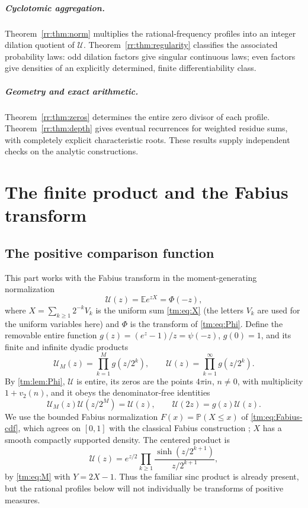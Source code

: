 \documentclass[11pt,a4paper,oneside,openany]{book}
\numberwithin{equation}{chapter}
\theoremstyle{definition}
\theoremstyle{remark}
\newcommand{\E}{\mathbb E}
\newcommand{\Prob}{\mathbb P}
\newcommand{\ii}{\mathrm i}
\newcommand{\Up}{\mathcal U}
\begin{document}
\paragraph{Cyclotomic aggregation.}
Theorem~\ref{rr:thm:norm} multiplies the rational-frequency profiles into an integer dilation quotient of \(\Up\). Theorem~\ref{rr:thm:regularity} classifies the associated probability laws: odd dilation factors give singular continuous laws; even factors give densities of an explicitly determined, finite differentiability class.

\paragraph{Geometry and exact arithmetic.}
Theorem~\ref{rr:thm:zeros} determines the entire zero divisor of each profile. Theorem~\ref{rr:thm:depth} gives eventual recurrences for weighted residue sums, with completely explicit characteristic roots. These results supply independent checks on the analytic constructions.

\chapter{The finite product and the Fabius transform}
\label{rr:sec:background}
\section{The positive comparison function}
This part works with the Fabius transform in the moment-generating
normalization
\begin{equation}\label{rr:eq:Umgf}
 \Up(z)=\E e^{zX}=\Phi(-z),
\end{equation}
where $X=\sum_{k\ge1}2^{-k}V_k$ is the uniform sum \eqref{tm:eq:X} (the
letters $V_k$ are used for the uniform variables here) and $\Phi$ is the
transform of \eqref{tm:eq:Phi}. Define the removable entire function
$g(z)=(e^z-1)/z=\psi(-z)$, $g(0)=1$, and its finite and infinite dyadic
products
\begin{equation}\label{rr:eq:U}
 \Up_M(z)=\prod_{k=1}^Mg(z/2^k),\qquad
 \Up(z)=\prod_{k=1}^{\infty}g(z/2^k).
\end{equation}
By \cref{tm:lem:Phi}, $\Up$ is entire, its zeros are the points $4\pi\ii n$,
$n\ne0$, with multiplicity $1+v_2(n)$, and it obeys the denominator-free
identities
\begin{equation}\label{rr:eq:Utail}
 \Up_M(z)\Up(z/2^M)=\Up(z),\qquad
 \Up(2z)=g(z)\Up(z).
\end{equation}
We use the bounded Fabius normalization $F(x)=\Prob(X\le x)$ of
\eqref{tm:eq:Fabius-cdf}, which agrees on $[0,1]$ with the classical Fabius
construction \cite{fabius}; $X$ has a smooth compactly supported density.
The centered product is
\begin{equation}\label{rr:eq:Usinh}
 \Up(z)=e^{z/2}\prod_{k\ge1}\frac{\sinh(z/2^{k+1})}{z/2^{k+1}},
\end{equation}
by \eqref{tm:eq:M} with $Y=2X-1$. Thus the familiar sinc product is already
present, but the rational profiles below will not individually be
transforms of positive measures.
\end{document}
